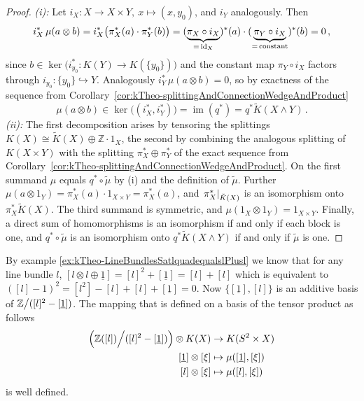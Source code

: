 \begin{proof}
\emph{(i):} Let $i_X\colon X\to X\times Y,\ x\mapsto(x,y_0)$, and
$i_Y$ analogously. Then
\begin{equation*}
	i_X^*\,\mu(a\otimes b)
	= i_X^*\big(\pi_X^*(a)\cdot\pi_Y^*(b)\big)
	= (\underbrace{\pi_X\circ i_X}_{=\,\operatorname{\mathrm{id}}_X})^*(a)\cdot
	  (\underbrace{\pi_Y\circ i_X}_{=\,\text{constant}})^*(b)=0\,,
\end{equation*}
since $b\in\ker\big(i_{y_0}^*\colon K(Y)\to K(\{y_0\})\big)$ and the
constant map $\pi_Y\circ i_X$ factors through
$i_{y_0}\colon\{y_0\}\hookrightarrow Y$. Analogously
$i_Y^*\,\mu(a\otimes b)=0$, so by exactness of the sequence from
Corollary~\ref{cor:kTheo-splittingAndConnectionWedgeAndProduct}
\begin{equation*}
	\mu(a\otimes b)\in\ker\big((i_X^*,i_Y^*)\big)
	=\operatorname{im}(q^*)=q^*\tilde K(X\wedge Y)\,.
\end{equation*}
\emph{(ii):} The first decomposition arises by tensoring the splittings
$K(X)\cong\tilde K(X)\oplus\mathbb{Z}\!\cdot\!1_X$, the second by combining
the analogous splitting of $K(X\times Y)$ with the splitting
$\pi_X^*\oplus\pi_Y^*$ of the exact sequence from
Corollary~\ref{cor:kTheo-splittingAndConnectionWedgeAndProduct}.
On the first summand $\mu$ equals $q^*\circ\tilde\mu$ by (i) and the
definition of $\tilde\mu$. Further
$\mu(a\otimes 1_Y)=\pi_X^*(a)\cdot 1_{X\times Y}=\pi_X^*(a)$, and
$\left.\pi_X^*\right|_{\tilde K(X)}$ is an isomorphism onto
$\pi_X^*\tilde K(X)$. The third summand is
symmetric, and $\mu(1_X\otimes 1_Y)=1_{X\times Y}$. Finally, a direct sum
of homomorphisms is an isomorphism if and only if each block is one, and
$q^*\circ\tilde\mu$ is an isomorphism onto $q^*\tilde K(X\wedge Y)$ if and
only if $\tilde\mu$ is one.
\end{proof}


By example \ref{ex:kTheo-LineBundlesSatlquadequalslPlusl} we know that for any line bundle $l$, $[l\otimes l \oplus \underline{1}]=[l]^2+[\underline{1}]=[l]+[l]$ which is equivalent to $([l]-1)^2=[l^2]-[l]+[l]+[\underline{1}]=0$. Now $\{[\underline{1}],[l]\}$ is an additive basis of $\mathbb{Z}\big/([l]^2-[\underline{1}])$. The mapping that is defined on a basis of the tensor product as follows
	\begin{align*}
		\Big(\mathbb{Z}([l])\Big/ ([l]^2-[\underline{1}])\Big) \otimes K(X) &\to K(S^2 \times X)\\
		[\underline{1}] \otimes [\xi]  &\mapsto \mu( [\underline{1}],[\xi])\\
		 [l] \otimes [\xi] &\mapsto \mu( [l], [\xi])
	\end{align*} is well defined. 

